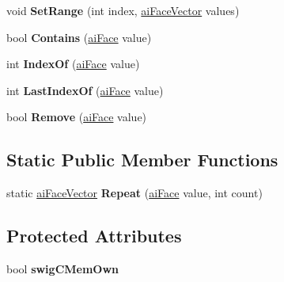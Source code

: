 \begin{DoxyCompactItemize}
\item 
\hypertarget{classai_face_vector_ae28d06081b667f4f44c560e07b946d2e}{void {\bfseries Set\+Range} (int index, \hyperlink{classai_face_vector}{ai\+Face\+Vector} values)}\label{classai_face_vector_ae28d06081b667f4f44c560e07b946d2e}

\item 
\hypertarget{classai_face_vector_a71a19bcffd1f26ba5e2e6fc8bf251d70}{bool {\bfseries Contains} (\hyperlink{structai_face}{ai\+Face} value)}\label{classai_face_vector_a71a19bcffd1f26ba5e2e6fc8bf251d70}

\item 
\hypertarget{classai_face_vector_a37b67f19dca301b9bdcf20387ae7cf7e}{int {\bfseries Index\+Of} (\hyperlink{structai_face}{ai\+Face} value)}\label{classai_face_vector_a37b67f19dca301b9bdcf20387ae7cf7e}

\item 
\hypertarget{classai_face_vector_a10a7cc332c45fc56c3a7cc4cc68acff9}{int {\bfseries Last\+Index\+Of} (\hyperlink{structai_face}{ai\+Face} value)}\label{classai_face_vector_a10a7cc332c45fc56c3a7cc4cc68acff9}

\item 
\hypertarget{classai_face_vector_ac26b922cbf55bc42fdf4020e8416f17f}{bool {\bfseries Remove} (\hyperlink{structai_face}{ai\+Face} value)}\label{classai_face_vector_ac26b922cbf55bc42fdf4020e8416f17f}

\end{DoxyCompactItemize}
\subsection*{Static Public Member Functions}
\begin{DoxyCompactItemize}
\item 
\hypertarget{classai_face_vector_a3486cc65bd972144beeeb8cdddedc73c}{static \hyperlink{classai_face_vector}{ai\+Face\+Vector} {\bfseries Repeat} (\hyperlink{structai_face}{ai\+Face} value, int count)}\label{classai_face_vector_a3486cc65bd972144beeeb8cdddedc73c}

\end{DoxyCompactItemize}
\subsection*{Protected Attributes}
\begin{DoxyCompactItemize}
\item 
\hypertarget{classai_face_vector_ae55257617977a215601ee3ac6823512d}{bool {\bfseries swig\+C\+Mem\+Own}}\label{classai_face_vector_ae55257617977a215601ee3ac6823512d}

\end{DoxyCompactItemize}

